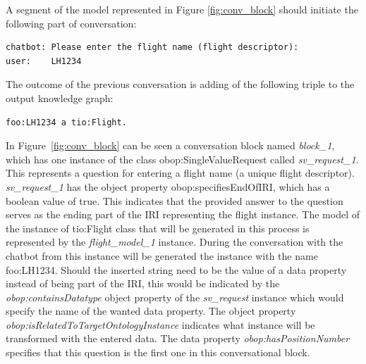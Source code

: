 \documentclass[runningheads]{llncs}
\begin{document}
A segment of the model represented in Figure \ref{fig:conv_block} should initiate the following part of conversation:
\begin{lstlisting}[basicstyle=\small,  xleftmargin=0.7cm ]
chatbot: Please enter the flight name (flight descriptor):
user:    LH1234
\end{lstlisting}
The outcome of the previous conversation is adding of the following triple to the output knowledge graph:
\begin{lstlisting}[basicstyle=\small,  xleftmargin=0.7cm ]
foo:LH1234 a tio:Flight. 
\end{lstlisting}
In Figure~\ref{fig:conv_block} can be seen a conversation block named \textit{block\_1}, which has one instance of the class obop:SingleValueRequest called \textit{sv\_request\_1}. This represents a question for entering a flight name (a unique flight descriptor). \textit{sv\_request\_1} has the object property obop:specifiesEndOfIRI, which has a boolean value of true. This indicates that the provided answer to the question serves as the ending part of the IRI representing the flight instance. The model of the instance of tio:Flight class that will be generated in this process is represented by the \textit{flight\_model\_1} instance. During the conversation with the chatbot from this instance will be generated the instance with the name foo:LH1234. Should the inserted string need to be the value of a data property instead of being part of the IRI, this would be indicated by the \textit{obop:containsDatatype} object property of the \textit{sv\_request} instance which would specify the name of the wanted data property. The object property \textit{obop:isRelatedToTargetOntologyInstance} indicates what instance will be transformed with the entered data. The data property \textit{obop:hasPositionNumber} specifies that this question is the first one in this conversational block.  


\FloatBarrier
\end{document}
